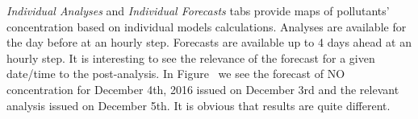\documentclass[9pt]{report}
\begin{document}
\noindent{}\emph{Individual Analyses} and \emph{Individual Forecasts} tabs provide maps of pollutants' concentration based on individual models calculations.
Analyses are available for the day before at an hourly step. 
Forecasts are available up to 4 days ahead at an hourly step.
It is interesting to see the relevance of the forecast for a given date/time to the post-analysis.
In Figure~ we see the forecast of NO concentration for December 4th, 2016 issued on December 3rd and the relevant analysis issued on December 5th.
It is obvious that results are quite different.%

\begin{figure}[h!]%
\begin{mdcenter}%
\end{mdcenter}
\end{figure}
\end{document}
